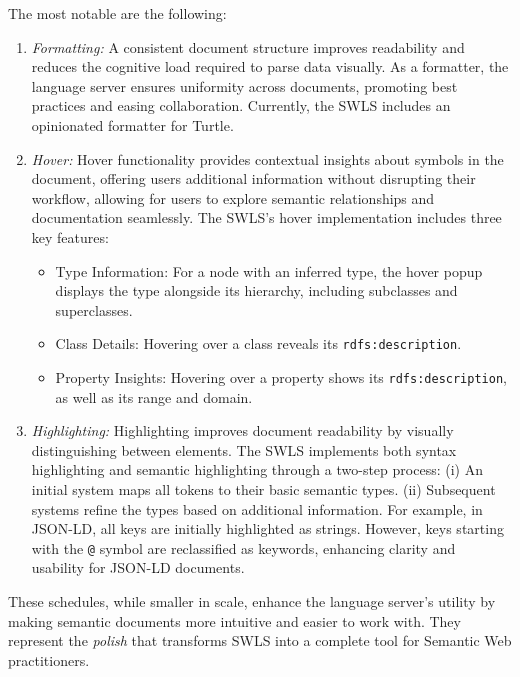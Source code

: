 The most notable are the following:
\begin{enumerate}
  \item \textit{Formatting:}
    A consistent document structure improves readability and reduces the cognitive load required to parse data visually.
    As a formatter, the language server ensures uniformity across documents, promoting best practices and easing collaboration.
    Currently, the SWLS includes an opinionated formatter for Turtle.

  \item \textit{Hover:}
    Hover functionality provides contextual insights about symbols in the document, offering users additional information without disrupting their workflow,
    allowing for users to explore semantic relationships and documentation seamlessly.
    The SWLS’s hover implementation includes three key features:
    \begin{itemize}
      \item Type Information: For a node with an inferred type, the hover popup displays the type alongside its hierarchy, including subclasses and superclasses.
      \item Class Details: Hovering over a class reveals its \texttt{rdfs:description}.
      \item Property Insights: Hovering over a property shows its \texttt{rdfs:description}, as well as its range and domain.
    \end{itemize}

  \item \textit{Highlighting:}
    Highlighting improves document readability by visually distinguishing between elements.
    The SWLS implements both syntax highlighting and semantic highlighting through a two-step process:
        (i) An initial system maps all tokens to their basic semantic types.
        (ii) Subsequent systems refine the types based on additional information.
    For example, in JSON-LD, all keys are initially highlighted as strings.
    However, keys starting with the \texttt{@} symbol are reclassified as keywords, enhancing clarity and usability for JSON-LD documents.
\end{enumerate}

These schedules, while smaller in scale, enhance the language server’s utility by making semantic documents more intuitive and easier to work with.
They represent the \textit{polish} that transforms SWLS into a complete tool for Semantic Web practitioners.